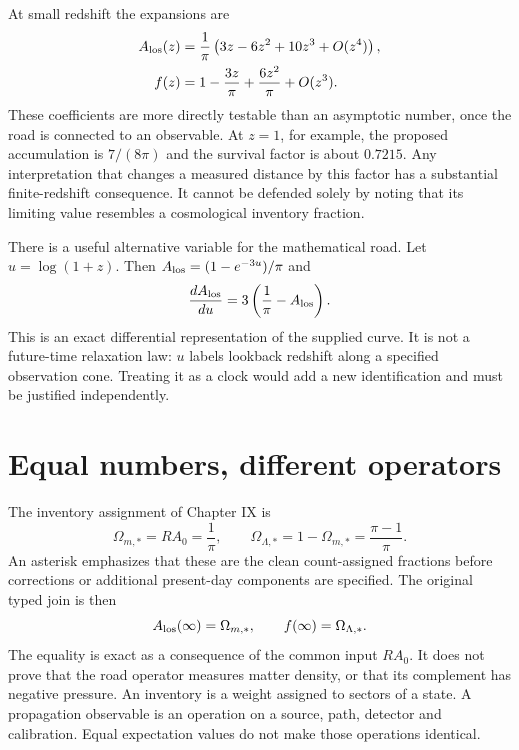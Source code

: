 At small redshift the expansions are
\begin{align}
 A_{\rm los}(z)&=\frac1\pi\left(3z-6z^2+10z^3+O(z^4)\right),
 \label{c12:roadseries}\\
 f(z)&=1-\frac{3z}{\pi}+\frac{6z^2}{\pi}+O(z^3).
 \label{c12:fseries}
\end{align}
These coefficients are more directly testable than an asymptotic number, once the road is connected to an observable. At $z=1$, for example, the proposed accumulation is $7/(8\pi)$ and the survival factor is about $0.7215$. Any interpretation that changes a measured distance by this factor has a substantial finite-redshift consequence. It cannot be defended solely by noting that its limiting value resembles a cosmological inventory fraction.

There is a useful alternative variable for the mathematical road. Let $u=\log(1+z)$. Then $A_{\rm los}=(1-e^{-3u})/\pi$ and
\begin{equation}
 \frac{dA_{\rm los}}{du}=3\left(\frac1\pi-A_{\rm los}\right).
 \label{c12:roadode}
\end{equation}
This is an exact differential representation of the supplied curve. It is not a future-time relaxation law: $u$ labels lookback redshift along a specified observation cone. Treating it as a clock would add a new identification and must be justified independently.

\section{Equal numbers, different operators}
The inventory assignment of Chapter IX is
\begin{equation}
 \Omega_{m,*}=RA_0=\frac1\pi,\qquad
 \Omega_{\Lambda,*}=1-\Omega_{m,*}=\frac{\pi-1}{\pi}.
 \label{c12:inventory}
\end{equation}
An asterisk emphasizes that these are the clean count-assigned fractions before corrections or additional present-day components are specified. The original typed join is then
\begin{equation}
 A_{\rm los}(\infty)=\Omega_{m,*},\qquad
 f(\infty)=\Omega_{\Lambda,*}.
 \label{c12:typedjoin}
\end{equation}
The equality is exact as a consequence of the common input $RA_0$. It does not prove that the road operator measures matter density, or that its complement has negative pressure. An inventory is a weight assigned to sectors of a state. A propagation observable is an operation on a source, path, detector and calibration. Equal expectation values do not make those operations identical.

